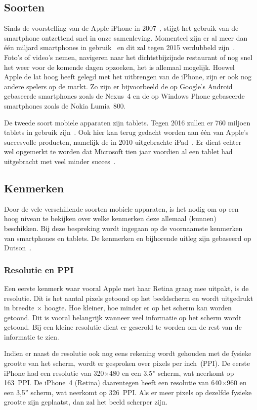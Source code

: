 \subsection{Soorten}
Sinds de voorstelling van de Apple iPhone in 2007~\cite{David2011}, stijgt het gebruik van de smartphone ontzettend snel in onze samenleving.  
Momenteel zijn er al meer dan één miljard smartphones in gebruik~\cite{Yang2012} en dit zal tegen 2015 verdubbeld zijn~\cite{Gillett2012}.
Foto's of video's nemen, navigeren naar het dichtstbijzijnde restaurant of nog snel het weer voor de komende dagen opzoeken, het is allemaal mogelijk. 
Hoewel Apple de lat hoog heeft gelegd met het uitbrengen van de iPhone, zijn er ook nog andere spelers op de markt. 
Zo zijn er bijvoorbeeld de op Google's Android gebaseerde smartphones zoals de Nexus~4 en de op Windows Phone gebaseerde smartphones zoals de Nokia Lumia~800.

De tweede soort mobiele apparaten zijn tablets.
Tegen 2016 zullen er 760 miljoen tablets in gebruik zijn~\cite{Gillett2012}.
Ook hier kan terug gedacht worden aan één van Apple's succesvolle producten, namelijk de in 2010 uitgebrachte iPad~\cite{Apple2010}. 
Er dient echter wel opgemerkt te worden dat Microsoft tien jaar voordien al een tablet had uitgebracht met veel minder succes~\cite{Microsoft2000}.

\subsection{Kenmerken}
Door de vele verschillende soorten mobiele apparaten, is het nodig om op een hoog niveau te bekijken over welke kenmerken deze allemaal (kunnen) beschikken. 
Bij deze bespreking wordt ingegaan op de voornaamste kenmerken van smartphones en tablets. 
De kenmerken en bijhorende uitleg zijn gebaseerd op Dutson~\cite{PhilDutson2012}.

\subsubsection{Resolutie en PPI}
Een eerste kenmerk waar vooral Apple met haar Retina graag mee uitpakt, is de resolutie. 
Dit is het aantal pixels getoond op het beeldscherm en wordt uitgedrukt in breedte $\times$ hoogte. 
Hoe kleiner, hoe minder er op het scherm kan worden getoond. 
Dit is vooral belangrijk wanneer veel informatie op het scherm wordt getoond. 
Bij een kleine resolutie dient er gescrold te worden om de rest van de informatie te zien.

Indien er naast de resolutie ook nog eens rekening wordt gehouden met de fysieke grootte van het scherm, wordt er gesproken over pixels per inch~(PPI). 
De eerste iPhone had een resolutie van 320$\times$480 en een 3,5” scherm, wat neerkomt op 163~PPI. 
De iPhone~4 (Retina) daarentegen heeft een resolutie van 640$\times$960 en een 3,5” scherm, wat neerkomt op 326~PPI. 
Als er meer pixels op dezelfde fysieke grootte zijn geplaatst, dan zal het beeld scherper zijn. 

